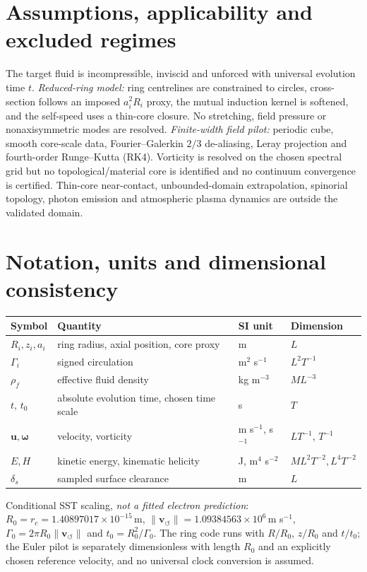 \documentclass[10pt,a4paper]{article}
\newcommand{\vswirl}{\mathbf{v}_{\!\boldsymbol{\circlearrowleft}}}
\newcommand{\rhoF}{\rho_{\!f}}
\newcommand{\rc}{r_c}
\begin{document}
\section{Assumptions, applicability and excluded regimes}
The target fluid is incompressible, inviscid and unforced with universal evolution time $t$. \emph{Reduced-ring model:} ring centrelines are constrained to circles, cross-section follows an imposed $a_i^2R_i$ proxy, the mutual induction kernel is softened, and the self-speed uses a thin-core closure. No stretching, field pressure or nonaxisymmetric modes are resolved. \emph{Finite-width field pilot:} periodic cube, smooth core-scale data, Fourier--Galerkin $2/3$ de-aliasing, Leray projection and fourth-order Runge--Kutta (RK4). Vorticity is resolved on the chosen spectral grid but no topological/material core is identified and no continuum convergence is certified. Thin-core near-contact, unbounded-domain extrapolation, spinorial topology, photon emission and atmospheric plasma dynamics are outside the validated domain.

\section{Notation, units and dimensional consistency}
\begin{center}\small\begin{tabular}{llll}\toprule
Symbol & Quantity & SI unit & Dimension\\\midrule
$R_i,z_i,a_i$ & ring radius, axial position, core proxy & m & $L$\\
$\Gamma_i$ & signed circulation & m$^2$ s$^{-1}$ & $L^2T^{-1}$\\
$\rhoF$ & effective fluid density & kg m$^{-3}$ & $ML^{-3}$\\
$t,\,t_0$ & absolute evolution time, chosen time scale & s & $T$\\
$\mathbf u,\boldsymbol\omega$ & velocity, vorticity & m s$^{-1}$, s$^{-1}$ & $LT^{-1}$, $T^{-1}$\\
$E,H$ & kinetic energy, kinematic helicity & J, m$^4$ s$^{-2}$ & $ML^2T^{-2},L^4T^{-2}$\\
$\delta_s$ & sampled surface clearance & m & $L$\\\bottomrule\end{tabular}\end{center}
Conditional SST scaling, \emph{not a fitted electron prediction}: $R_0=\rc=1.40897017\times10^{-15}\,$m, $\lVert\vswirl\rVert=1.09384563\times10^6\,$m s$^{-1}$, $\Gamma_0=2\pi R_0\lVert\vswirl\rVert$ and $t_0=R_0^2/\Gamma_0$. The ring code runs with $R/R_0$, $z/R_0$ and $t/t_0$; the Euler pilot is separately dimensionless with length $R_0$ and an explicitly chosen reference velocity, and no universal clock conversion is assumed.
\end{document}
